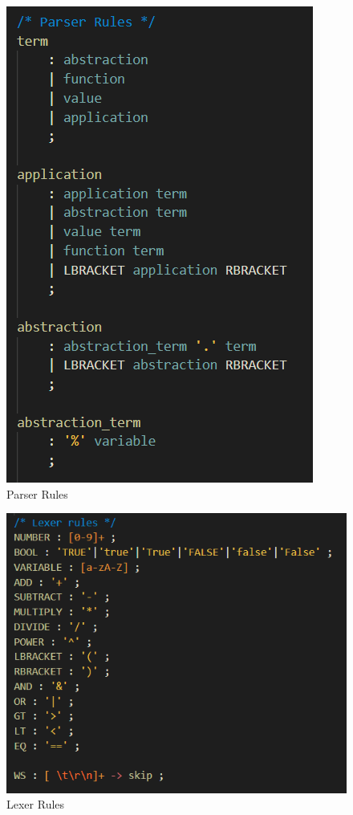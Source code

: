 \documentclass[a4paper,12pt]{report}
\begin{document}
\begin{figure}[p]
\centering
\includegraphics[scale=0.75]{images/parser_rules}
\caption{Parser Rules}
\label{parser_rules}
\end{figure}

\begin{figure}[p]
\centering
\includegraphics[scale=0.75]{images/lexer_rules}
\caption{Lexer Rules}
\label{lexer_rules}
\end{figure}
\end{document}
